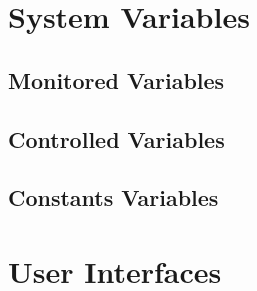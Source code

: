 \documentclass[12pt, titlepage]{article}
\begin{document}
\section{System Variables}


\subsection{Monitored Variables}

\subsection{Controlled Variables}

\subsection{Constants Variables}

\section{User Interfaces}
\end{document}
